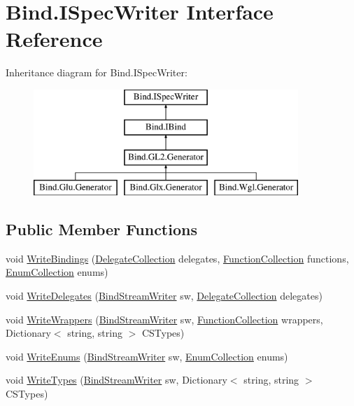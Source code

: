 \hypertarget{interface_bind_1_1_i_spec_writer}{
\section{Bind.ISpecWriter Interface Reference}
\label{interface_bind_1_1_i_spec_writer}
}
Inheritance diagram for Bind.ISpecWriter:\begin{figure}[H]
\begin{center}
\leavevmode
\includegraphics[height=4.000000cm]{interface_bind_1_1_i_spec_writer}
\end{center}
\end{figure}
\subsection*{Public Member Functions}
\begin{DoxyCompactItemize}
\item 
void \hyperlink{interface_bind_1_1_i_spec_writer_af795c015c829754be6031b1e2eb94d1a}{WriteBindings} (\hyperlink{class_bind_1_1_structures_1_1_delegate_collection}{DelegateCollection} delegates, \hyperlink{class_bind_1_1_structures_1_1_function_collection}{FunctionCollection} functions, \hyperlink{class_bind_1_1_structures_1_1_enum_collection}{EnumCollection} enums)
\item 
void \hyperlink{interface_bind_1_1_i_spec_writer_a2ebe856db39abcd35464ebd9b6bc2727}{WriteDelegates} (\hyperlink{class_bind_1_1_bind_stream_writer}{BindStreamWriter} sw, \hyperlink{class_bind_1_1_structures_1_1_delegate_collection}{DelegateCollection} delegates)
\item 
void \hyperlink{interface_bind_1_1_i_spec_writer_a079c72b49576f487a3679655a81c6941}{WriteWrappers} (\hyperlink{class_bind_1_1_bind_stream_writer}{BindStreamWriter} sw, \hyperlink{class_bind_1_1_structures_1_1_function_collection}{FunctionCollection} wrappers, Dictionary$<$ string, string $>$ CSTypes)
\item 
void \hyperlink{interface_bind_1_1_i_spec_writer_aa940eabf79cce14e9c7f69fe587dffc1}{WriteEnums} (\hyperlink{class_bind_1_1_bind_stream_writer}{BindStreamWriter} sw, \hyperlink{class_bind_1_1_structures_1_1_enum_collection}{EnumCollection} enums)
\item 
void \hyperlink{interface_bind_1_1_i_spec_writer_a7037f2d3115f51b955c055da9ef1f309}{WriteTypes} (\hyperlink{class_bind_1_1_bind_stream_writer}{BindStreamWriter} sw, Dictionary$<$ string, string $>$ CSTypes)
\end{DoxyCompactItemize}


